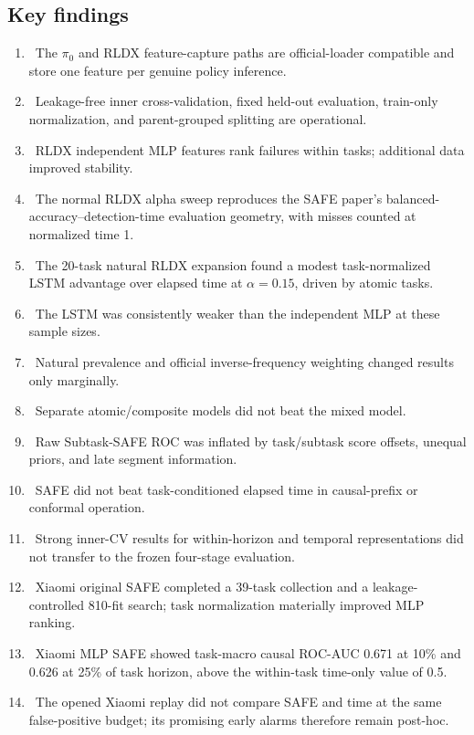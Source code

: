 \documentclass[11pt,a4paper]{article}
\newcommand{\good}{\textcolor{teal}{\ding{51}}}
\newcommand{\bad}{\textcolor{orange}{\ding{55}}}
\begin{document}
\subsection{Key findings}
\begin{enumerate}
\item \good\ The $\pi_0$ and RLDX feature-capture paths are official-loader compatible and store one feature per genuine policy inference.
\item \good\ Leakage-free inner cross-validation, fixed held-out evaluation, train-only normalization, and parent-grouped splitting are operational.
\item \good\ RLDX independent MLP features rank failures within tasks; additional data improved stability.
\item \good\ The normal RLDX alpha sweep reproduces the SAFE paper's balanced-accuracy--detection-time evaluation geometry, with misses counted at normalized time 1.
\item \good\ The 20-task natural RLDX expansion found a modest task-normalized LSTM advantage over elapsed time at $\alpha=0.15$, driven by atomic tasks.
\item \bad\ The LSTM was consistently weaker than the independent MLP at these sample sizes.
\item \bad\ Natural prevalence and official inverse-frequency weighting changed results only marginally.
\item \bad\ Separate atomic/composite models did not beat the mixed model.
\item \bad\ Raw Subtask-SAFE ROC was inflated by task/subtask score offsets, unequal priors, and late segment information.
\item \bad\ SAFE did not beat task-conditioned elapsed time in causal-prefix or conformal operation.
\item \bad\ Strong inner-CV results for within-horizon and temporal representations did not transfer to the frozen four-stage evaluation.
\item \good\ Xiaomi original SAFE completed a 39-task collection and a leakage-controlled 810-fit search; task normalization materially improved MLP ranking.
\item \good\ Xiaomi MLP SAFE showed task-macro causal ROC-AUC 0.671 at 10\% and 0.626 at 25\% of task horizon, above the within-task time-only value of 0.5.
\item \bad\ The opened Xiaomi replay did not compare SAFE and time at the same false-positive budget; its promising early alarms therefore remain post-hoc.

\end{enumerate}
\end{document}
